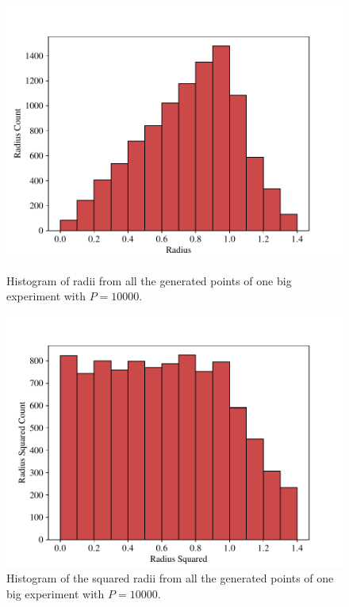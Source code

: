 \begin{figure}[h!]
    \centering
    \begin{minipage}{.45\linewidth}
        \centering
        \includegraphics[width=\linewidth]{figs/ex1.1_radii_hist.pdf}
        \caption{Histogram of radii from all the generated points of one big experiment
            with $P=\num{10000}$.}
        \label{fig:radii_hist}
    \end{minipage}
    \hfill
    \begin{minipage}{.45\linewidth}
        \centering
        \includegraphics[width=\linewidth]{figs/ex1.1_radii_squared_hist.pdf}
        \caption{Histogram of the squared radii from all the generated points of one big experiment
            with $P=\num{10000}$.}
        \label{fig:radii_squared_hist}
    \end{minipage}

\end{figure}

